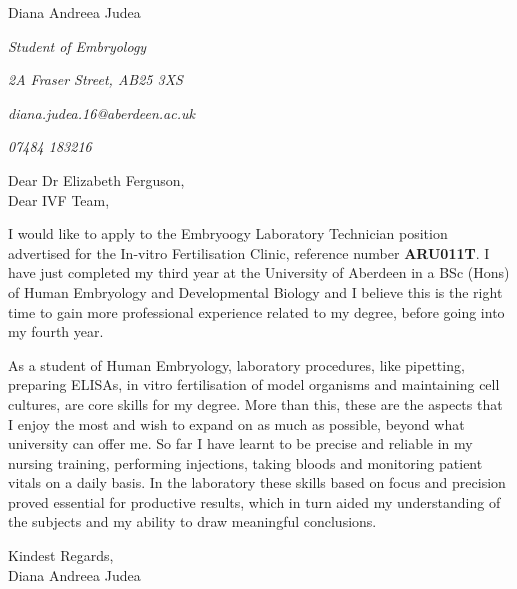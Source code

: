 \documentclass[paper=a4,fontsize=11pt]{scrartcl} %
\newcommand{\sepspace}{\vspace*{1em}}		%
\newcommand{\MyName}[1]{ %
  \Huge \usefont{OT1}{phv}{b}{n} \hfill #1
  \par \normalsize \normalfont}
\newcommand{\MySlogan}[4]{ %
  \large \usefont{OT1}{phv}{m}{n}\hfill \textit{#1} 
  \sepspace
  \par \normalsize \usefont{OT1}{phv}{m}{n}\hfill \textit{#2}
  \par \normalsize \usefont{OT1}{phv}{m}{n}\hfill \textit{#3}
  \par \normalsize \usefont{OT1}{phv}{m}{n}\hfill \textit{#4}
  \par \normalsize \normalfont}
\begin{document}
  
  \MyName{Diana Andreea Judea}
  \MySlogan{Student of Embryology}{2A Fraser Street, AB25 3XS}{diana.judea.16@aberdeen.ac.uk}{07484 183216}
  \sepspace \sepspace
  
  \noindent
  Dear Dr Elizabeth Ferguson, \\
  Dear IVF Team,
  
  \sepspace
  
    \noindent
    I would like to apply to the Embryoogy Laboratory Technician position advertised for the In-vitro Fertilisation Clinic, reference number \textbf{ARU011T}. I have just completed my third year at the University of Aberdeen in a BSc (Hons) of Human Embryology and Developmental Biology and I believe this is the right time to gain more professional experience related to my degree, before going into my fourth year.
    \sepspace
    
    
    \noindent
    
    \sepspace
    
    
    \noindent
    As a student of Human Embryology, laboratory procedures, like pipetting, preparing ELISAs, in vitro fertilisation of model organisms and maintaining cell cultures, are core skills for my degree. More than this, these are the aspects that I enjoy the most and wish to expand on as much as possible, beyond what university can offer me. So far I have learnt to be precise and reliable in my nursing training, performing injections, taking bloods and monitoring patient vitals on a daily basis. In the laboratory these skills based on focus and precision proved essential for productive results, which in turn aided my understanding of the subjects and my ability to draw meaningful conclusions.
    \sepspace
    
    
    \noindent
    


  \sepspace
  
  \noindent
  Kindest Regards, \\
  Diana Andreea Judea
  
  
  
\end{document}

